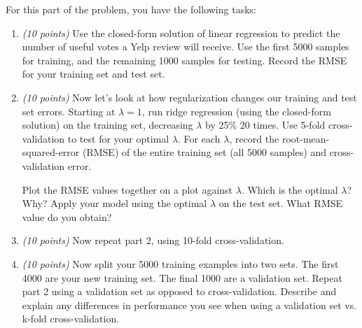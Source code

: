 \documentclass[letterpaper]{article}
\begin{document}
\noindent For this part of the problem, you have the following tasks:
\begin{enumerate}
  \item \emph{(10 points)} Use the closed-form solution of linear regression to
  predict the number of useful votes a Yelp review will receive.
  Use the first 5000 samples for training, and the remaining 1000 samples for testing. Record the RMSE for your training set and test set.
  
  \item \emph{(10 points)} Now let's look at how regularization changes our training and test set errors.
  Starting at $\lambda = 1$, run ridge regression (using the closed-form solution) on the training set, decreasing $\lambda$ by 25\% 20 times.
  Use 5-fold cross-validation to test for your optimal $\lambda$. For each $\lambda$, record the root-mean-squared-error (RMSE) of the entire training set (all 5000 samples)
  and cross-validation error.
  
  Plot the RMSE values together on a plot against $\lambda$. Which is the optimal $\lambda$? Why? Apply your model using the optimal $\lambda$ on the test set.
  What RMSE value do you obtain?
  		
  \item \emph{(10 points)} Now repeat part 2, using 10-fold cross-validation.
   
  \item \emph{(10 points)} Now split your 5000 training examples into two sets. The first 4000 are your new training set. The final 1000 are a validation set. Repeat part 2 using a validation set as opposed to cross-validation.
  Describe and explain any differences in performance you see when using a validation set vs. k-fold cross-validation.
\end{enumerate}  
\end{document}
